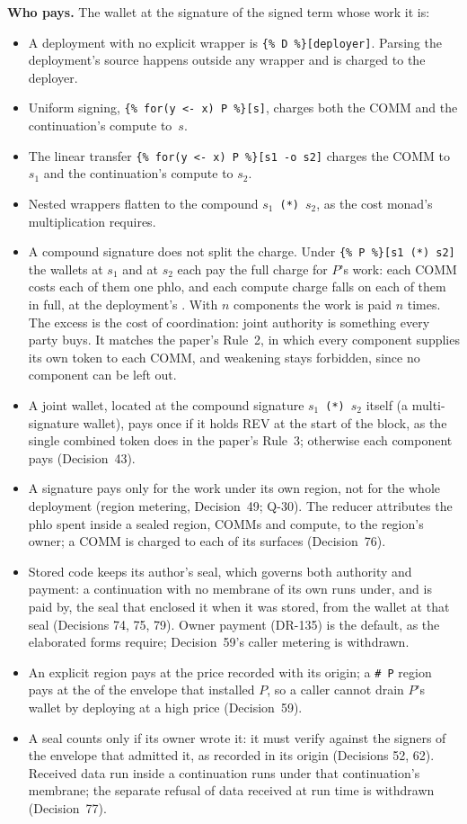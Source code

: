 \documentclass[11pt]{article}
\newcommand{\code}{\path}
\newcommand{\signed}[2]{\texttt{\{\%\,#1\,\%\}[#2]}}
\begin{document}
\textbf{Who pays.} The wallet at the signature of the signed term whose work it is:
\begin{itemize}
\item A deployment with no explicit wrapper is \signed{D}{deployer}. Parsing the deployment's source happens outside any wrapper and is charged to the deployer.
\item Uniform signing, \signed{for(y <- x) P}{s}, charges both the COMM and the continuation's compute to~$s$.
\item The linear transfer \signed{for(y <- x) P}{s1 -o s2} charges the COMM to $s_1$ and the continuation's compute to $s_2$.
\item Nested wrappers flatten to the compound $s_1$~\texttt{(*)}~$s_2$, as the cost monad's multiplication requires.
\item A compound signature does not split the charge. Under \signed{P}{s1 (*) s2} the wallets at $s_1$ and at $s_2$ each pay the full charge for $P$'s work: each COMM costs each of them one phlo, and each compute charge falls on each of them in full, at the deployment's \code{phloPrice}. With $n$ components the work is paid $n$ times. The excess is the cost of coordination: joint authority is something every party buys. It matches the paper's Rule~2, in which every component supplies its own token to each COMM, and weakening stays forbidden, since no component can be left out.
\item A joint wallet, located at the compound signature $s_1$~\texttt{(*)}~$s_2$ itself (a multi-signature wallet), pays once if it holds REV at the start of the block, as the single combined token does in the paper's Rule~3; otherwise each component pays (Decision~43).
\item A signature pays only for the work under its own region, not for the whole deployment (region metering, Decision~49; Q-30). The reducer attributes the phlo spent inside a sealed region, COMMs and compute, to the region's owner; a COMM is charged to each of its surfaces (Decision~76).
\item Stored code keeps its author's seal, which governs both authority and payment: a continuation with no membrane of its own runs under, and is paid by, the seal that enclosed it when it was stored, from the wallet at that seal (Decisions 74, 75, 79). Owner payment (DR-135) is the default, as the elaborated forms require; Decision~59's caller metering is withdrawn.
\item An explicit region pays at the price recorded with its origin; a \texttt{\# P} region pays at the \code{phloPrice} of the envelope that installed $P$, so a caller cannot drain $P$'s wallet by deploying at a high price (Decision~59).
\item A seal counts only if its owner wrote it: it must verify against the signers of the envelope that admitted it, as recorded in its origin (Decisions 52, 62). Received data run inside a continuation runs under that continuation's membrane; the separate refusal of data received at run time is withdrawn (Decision~77).
\end{itemize}
\end{document}
